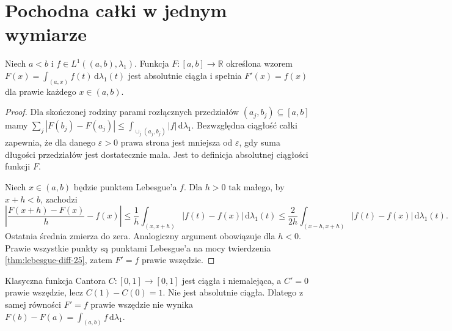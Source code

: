\section{Pochodna całki w jednym wymiarze}
\begin{twierdzenie}
\label{thm:FTC-lebesgue-25}
Niech $a<b$ i $f\in L^1((a,b),\lambda_1)$. Funkcja
$F:[a,b]\to\mathbb R$ określona wzorem
$F(x)=\int_{(a,x)}f(t)\,\mathrm d\lambda_1(t)$
jest absolutnie ciągła i spełnia
$F'(x)=f(x)$ dla prawie każdego $x\in(a,b)$.
\end{twierdzenie}
\begin{proof}
Dla skończonej rodziny parami rozłącznych przedziałów
$(a_j,b_j)\subseteq[a,b]$ mamy
$\sum_j|F(b_j)-F(a_j)|
\le\int_{\cup_j(a_j,b_j)}|f|\,\mathrm d\lambda_1$.
Bezwzględna ciągłość całki zapewnia, że dla danego
$\varepsilon>0$ prawa strona jest mniejsza od
$\varepsilon$, gdy suma długości przedziałów jest
dostatecznie mała. Jest to definicja absolutnej
ciągłości funkcji $F$.

Niech $x\in(a,b)$ będzie punktem Lebesgue'a $f$.
Dla $h>0$ tak małego, by $x+h<b$, zachodzi
\[
 \left|\frac{F(x+h)-F(x)}h-f(x)\right|
 \le\frac1h\int_{(x,x+h)}|f(t)-f(x)|\,
 \mathrm d\lambda_1(t)
 \le\frac2{2h}\int_{(x-h,x+h)}|f(t)-f(x)|\,
 \mathrm d\lambda_1(t).
\]
Ostatnia średnia zmierza do zera. Analogiczny argument
obowiązuje dla $h<0$. Prawie wszystkie punkty są
punktami Lebesgue'a na mocy twierdzenia
\ref{thm:lebesgue-diff-25}, zatem $F'=f$ prawie
wszędzie.
\end{proof}

\begin{przyklad}
Klasyczna funkcja Cantora $C:[0,1]\to[0,1]$ jest
ciągła i niemalejąca, a $C'=0$ prawie wszędzie, lecz
$C(1)-C(0)=1$. Nie jest absolutnie ciągła.
Dlatego z samej równości $F'=f$ prawie wszędzie nie
wynika $F(b)-F(a)=\int_{(a,b)}f\,\mathrm d\lambda_1$.
\end{przyklad}

